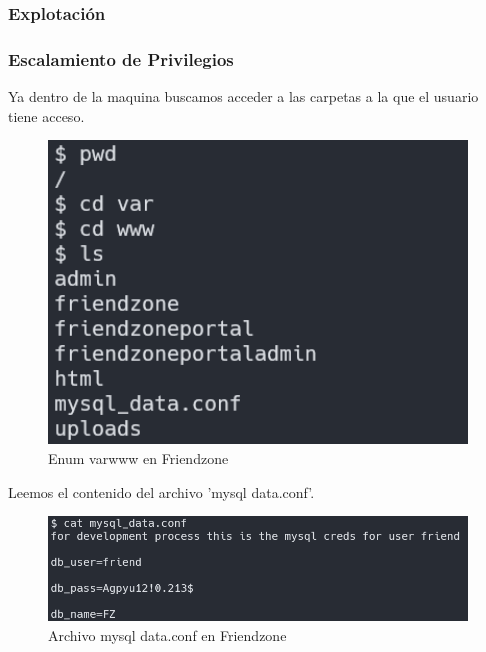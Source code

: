     \subsubsection{Explotación}

    \subsubsection{Escalamiento de Privilegios}
        \large{Ya dentro de la maquina buscamos acceder a las carpetas a la que el usuario tiene acceso.}
        \par
        \begin{figure}[H]
            \centering
            \includegraphics[width=0.99\textwidth]{informe4/imagenes/friendzone/20_enum_varwww.png}
            \caption{Enum varwww en Friendzone} 
        \end{figure}

        \large{Leemos el contenido del archivo 'mysql data.conf'.}
        \par
        \begin{figure}[H]
            \centering
            \includegraphics[width=0.99\textwidth]{informe4/imagenes/friendzone/21_password_friend.png}
            \caption{Archivo mysql data.conf en Friendzone} 
        \end{figure}

